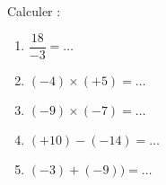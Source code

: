
\begin{exercice}\label{exosmath-0826}

    Calculer :
    \begin{enumerate}
        \item
            \( \dfrac{ 18 }{ -3 }=\ldots\)
        \item
            \( (-4)\times (+5)=\ldots\)
        \item
            \( (-9)\times (-7)=\ldots\)
        \item
            \( (+10)-(-14)=\ldots\)
        \item
            \( (-3)+(-9))=\ldots\)
    \end{enumerate}


\end{exercice}
